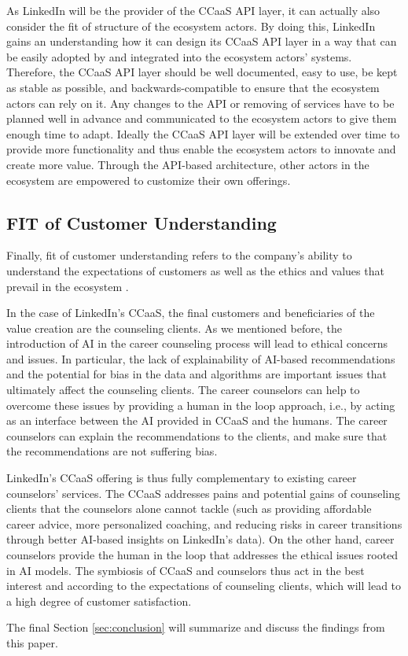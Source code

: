 As LinkedIn will be the provider of the CCaaS API layer, it can actually also consider the fit of
structure of the ecosystem actors. By doing this, LinkedIn gains an understanding how it can design 
its CCaaS API layer in a way that can be easily adopted by and integrated into the ecosystem actors'
systems. Therefore, the CCaaS API layer should be well documented, easy to use, be kept as stable
as possible, and backwards-compatible to ensure that the ecosystem actors can rely on it. Any changes
to the API  or removing of services have to be planned well in advance and communicated to the ecosystem
actors to give them enough time to adapt. Ideally the CCaaS API layer will be extended over time to provide
more functionality and thus enable the ecosystem actors to innovate and create more value. Through
the API-based architecture, other actors in the ecosystem are empowered to customize their own offerings.



\subsection{FIT of Customer Understanding}

Finally, fit of customer understanding refers to the company's ability to understand the expectations 
of customers as well as the ethics and values that prevail in the ecosystem \citep[p.~53]{griederDigitalEcosystemHow2019}.

In the case of LinkedIn's CCaaS, the final customers and beneficiaries of the value creation are the
counseling clients. As we mentioned before, the introduction of AI in the career counseling process
will lead to ethical concerns and issues. In particular, the lack of explainability of AI-based
recommendations and the potential for bias in the data and algorithms are important issues that 
ultimately affect the counseling clients. The career counselors can help to overcome these issues by providing
a human in the loop approach, i.e., by acting as an interface between the AI provided in CCaaS and the 
humans. The career counselors can explain the recommendations to the clients, and make sure that the 
recommendations are not suffering bias. 

LinkedIn's CCaaS offering is thus fully complementary to existing career counselors' services. The CCaaS
addresses pains and potential gains of counseling clients that the counselors alone cannot tackle 
(such as providing affordable career advice, more personalized coaching, and reducing risks 
in career transitions through better AI-based insights on LinkedIn's data). On the other hand, career 
counselors provide the human in the loop that addresses the ethical issues rooted in AI models. The symbiosis
of CCaaS and counselors thus act in the best interest and according to the expectations of counseling clients,
which will lead to a high degree of customer satisfaction.
\newline

\noindent The final Section \ref{sec:conclusion} will summarize and discuss the findings from 
this paper.

